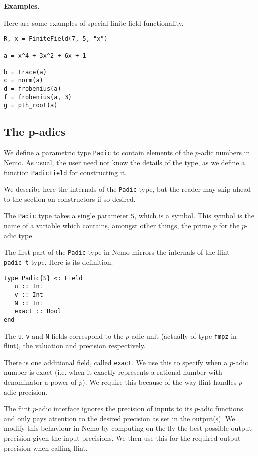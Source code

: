 \documentclass[a4paper,10pt]{article}
\newcommand{\code}{\lstinline}
\begin{document}
{{\textbf{Examples.}

Here are some examples of special finite field functionality.

\begin{lstlisting}
R, x = FiniteField(7, 5, "x")

a = x^4 + 3x^2 + 6x + 1

b = trace(a)
c = norm(a)
d = frobenius(a)
f = frobenius(a, 3)
g = pth_root(a)
\end{lstlisting}

\subsection{The p-adics}

We define a parametric type \code{Padic} to contain elements of the $p$-adic
numbers in Nemo. As usual, the user need not know the details of the type, as
we define a function \code{PadicField} for constructing it.

We describe here the internals of the \code{Padic} type, but the reader may
skip ahead to the section on constructors if so desired.

The \code{Padic} type takes a single parameter \code{S}, which is a symbol.
This symbol is the name of a variable which contains, amongst other things,
the prime $p$ for the $p$-adic type.

The first part of the \code{Padic} type in Nemo mirrors the internals of the
flint \code{padic_t} type. Here is its definition.

\begin{lstlisting}
type Padic{S} <: Field
   u :: Int 
   v :: Int
   N :: Int
   exact :: Bool
end
\end{lstlisting}

The \code{u}, \code{v} and \code{N} fields correspond to the $p$-adic unit
(actually of type \code{fmpz} in flint), the valuation and precision
respectively. 

There is one additional field, called \code{exact}. We use this to specify
when a $p$-adic number is exact (i.e. when it exactly represents a rational
number with denominator a power of $p$). We require this because of the way
flint handles $p$-adic precision.

The flint $p$-adic interface ignores the precision of inputs to its $p$-adic
functions and only pays attention to the desired precision as set in the
output(s). We modify this behaviour in Nemo by computing on-the-fly the best
possible output precision given the input precisions. We then use this for the
required output precision when calling flint.

}}
\end{document}
